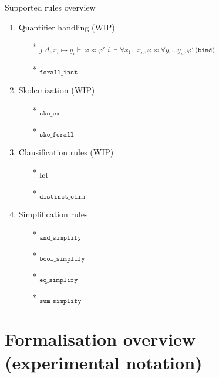 \documentclass[aspectratio=169,xcolor={dvipsnames}]{beamer}
\begin{document}
\begin{frame}[t]{Supported rules overview}
\begin{multicols}{2}
\begin{enumerate}
\begin{itemize}
            \end{itemize}
            \item Quantifier handling (WIP)
            \begin{itemize}
                \item[*] \textsubscript{$j.  \Delta, x_i \mapsto y_i \vdash~ \varphi \approx \varphi'$}
                    \newline \textsubscript{$i. \vdash  \forall x_1 \dots x_n, \varphi \approx \forall y_1 \dots y_n, \varphi' ~\texttt{(bind)}$}
                \item[*] \textsubscript{$\texttt{forall\_inst}$}
            \end{itemize}
            \item Skolemization (WIP)
            \begin{itemize}
                \item[*] \textsubscript{$\texttt{sko\_ex}$}
                \item[*] \textsubscript{$\texttt{sko\_forall}$}
            \end{itemize}
            \item Clausification rules (WIP)
            \begin{itemize}
                \item[*] \textsubscript{$\textbf{let}$}
                \item[*] \textsubscript{$\texttt{distinct\_elim}$}
            \end{itemize}

            \item Simplification rules \texttimes
            \begin{itemize}
                \item[*] \textsubscript{$\texttt{and\_simplify}$}
                \item[*] \textsubscript{$\texttt{bool\_simplify}$}
                \item[*] \textsubscript{$\texttt{eq\_simplify}$}
                \item[*] \textsubscript{$\texttt{sum\_simplify}$}
            \end{itemize}
        \end{enumerate}
    \end{multicols}
\end{frame}


\section{Formalisation overview (experimental notation)}
\end{document}
